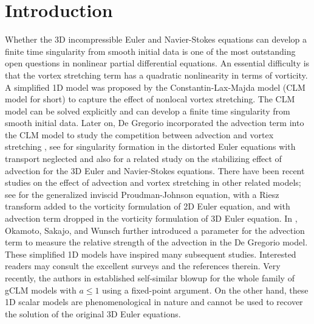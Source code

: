 \documentclass[12pt]{caltech_thesis}
\numberwithin{equation}{section}
\begin{document}
\section{Introduction}

Whether the 3D incompressible Euler and Navier-Stokes equations can develop a finite time singularity from smooth initial data is one of the most outstanding open questions in nonlinear partial differential equations. An essential difficulty is that the vortex stretching term has a quadratic nonlinearity in terms of vorticity. A simplified 1D model was proposed by the Constantin-Lax-Majda model (CLM model for short) \cite{constantin1985simple} to capture the effect of nonlocal vortex stretching. The CLM model can be solved explicitly and can develop a finite time singularity from smooth initial data. Later on, De Gregorio incorporated the advection term into the CLM model to study the competition between advection and vortex stretching \cite{de1990one,de1996partial}, see  {\cite{constantin1986} for singularity formation in the distorted Euler equations with transport neglected and also   \cite{hou2008dynamic,lei2009stabilizing} for a related study on the stabilizing effect of advection for the 3D Euler and Navier-Stokes equations. There have been recent studies on the effect of advection and vortex stretching in other related models; see \cite{sarria2013blow} for the generalized inviscid Proudman-Johnson equation, \cite{elgindi2022strong} with a Riesz transform added to the vorticity formulation of 2D Euler equation, and \cite{miller2023finite} with advection term dropped in the vorticity formulation of 3D Euler equation.}  In \cite{okamoto2008generalization},
Okamoto, Sakajo, and Wunsch further introduced a parameter for the advection term to measure the relative strength of the advection in the De Gregorio model. These simplified 1D models have inspired  many subsequent studies. Interested readers may consult the excellent surveys \cite{constantin2007euler,gibbon2008three,kiselev2018,majda2002vorticity} and the references therein. {Very recently, the authors in \cite{huang2023self} established self-similar blowup for the whole family of gCLM models with $a\leq1$ using a fixed-point argument.}
On the other hand, these 1D scalar models are phenomenological in nature and cannot be used to recover the solution of the original 3D Euler equations. 
\end{document}
